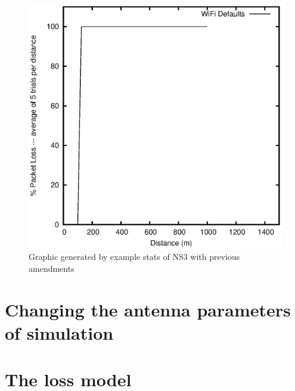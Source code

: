 \documentclass[a4paper,10pt]{article}
\begin{document}
\begin{figure}[h]
        	\centering
    \includegraphics[scale=0.75]{wifi-default.eps}
    \caption{Graphic generated by example stats of NS3 with previous amendments}
    \label{fig:inicio}
        \end{figure}


\section{Changing the antenna parameters of simulation}

\section{The loss model}
\end{document}
